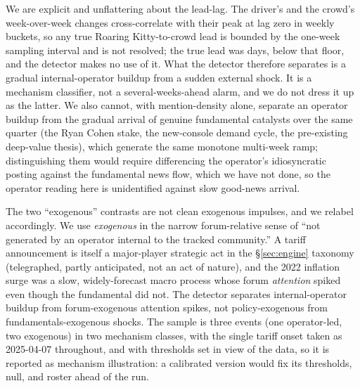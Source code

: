 \documentclass[11pt]{article}
\begin{document}
We are explicit and unflattering about the lead-lag. The driver's and the crowd's week-over-week changes cross-correlate with their peak at lag zero in weekly buckets, so any true Roaring Kitty-to-crowd lead is bounded by the one-week sampling interval and is not resolved; the true lead was days, below that floor, and the detector makes no use of it. What the detector therefore separates is a gradual internal-operator buildup from a sudden external shock. It is a mechanism classifier, not a several-weeks-ahead alarm, and we do not dress it up as the latter. We also cannot, with mention-density alone, separate an operator buildup from the gradual arrival of genuine fundamental catalysts over the same quarter (the Ryan Cohen stake, the new-console demand cycle, the pre-existing deep-value thesis), which generate the same monotone multi-week ramp; distinguishing them would require differencing the operator's idiosyncratic posting against the fundamental news flow, which we have not done, so the operator reading here is unidentified against slow good-news arrival.

The two ``exogenous'' contrasts are not clean exogenous impulses, and we relabel accordingly. We use \emph{exogenous} in the narrow forum-relative sense of ``not generated by an operator internal to the tracked community.'' A tariff announcement is itself a major-player strategic act in the \S\ref{sec:engine} taxonomy (telegraphed, partly anticipated, not an act of nature), and the 2022 inflation surge was a slow, widely-forecast macro process whose forum \emph{attention} spiked even though the fundamental did not. The detector separates internal-operator buildup from forum-exogenous attention spikes, not policy-exogenous from fundamentals-exogenous shocks. The sample is three events (one operator-led, two exogenous) in two mechanism classes, with the single tariff onset taken as 2025-04-07 throughout, and with thresholds set in view of the data, so it is reported as mechanism illustration: a calibrated version would fix its thresholds, null, and roster ahead of the run.
\end{document}
